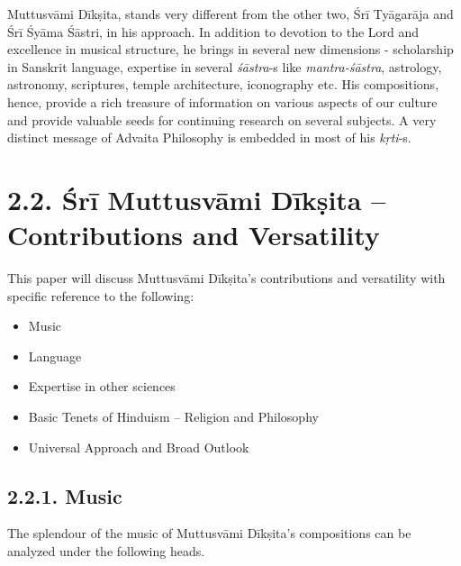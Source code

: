 Muttusvāmi Dīkṣita, stands very different from the other two, Śrī Tyāgarāja and Śrī Śyāma Śāstri, in his approach. In addition to devotion to the Lord and excellence in musical structure, he brings in several new dimensions - scholarship in Sanskrit language, expertise in several \textit{śāstra}-s like \textit{mantra-śāstra}, astrology, astronomy, scriptures, temple architecture, iconography etc. His compositions, hence, provide a rich treasure of information on various aspects of our culture and provide valuable seeds for continuing research on several subjects. A very distinct message of Advaita Philosophy is embedded in most of his \textit{kṛti}-s.


\section*{2.2. Śrī Muttusvāmi Dīkṣita – Contributions and Versatility}

This paper will discuss Muttusvāmi Dīkṣita’s contributions and versatility with specific reference to the following:

\begin{itemize}
\itemsep=0pt

 \item Music

 \item Language

 \item Expertise in other sciences

 \item Basic Tenets of Hinduism – Religion and Philosophy

 \item Universal Approach and Broad Outlook

\end{itemize}


\subsection*{2.2.1. Music}

The splendour of the music of Muttusvāmi Dīkṣita’s compositions can be analyzed under the following heads.

